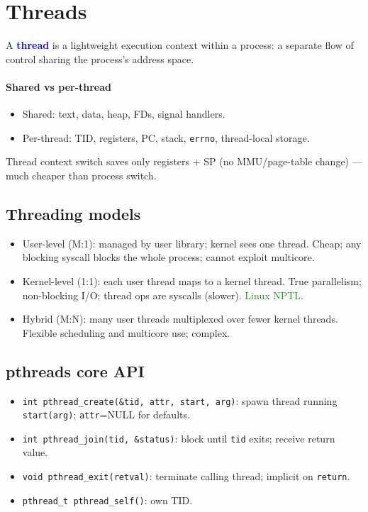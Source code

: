 \section{Threads}
A \textcolor{Blue}{\textbf{thread}} is a lightweight execution context within a process: a separate flow of control sharing the process's address space.

\paragraph{Shared vs per-thread}
\begin{itemize}
  \item \textcolor{Bittersweet}{Shared}: text, data, heap, FDs, signal handlers.
  \item \textcolor{Bittersweet}{Per-thread}: TID, registers, PC, stack, \texttt{errno}, thread-local storage.
\end{itemize}
Thread context switch saves only registers + SP (no MMU/page-table change) — much cheaper than process switch.

\subsection{Threading models}
\begin{itemize}
  \item \textcolor{Bittersweet}{User-level (M:1)}: managed by user library; kernel sees one thread. Cheap; \textcolor{Bittersweet}{any} blocking syscall blocks the whole process; cannot exploit multicore.
  \item \textcolor{Bittersweet}{Kernel-level (1:1)}: each user thread maps to a kernel thread. True parallelism; non-blocking I/O; thread ops are syscalls (slower). \textcolor{ForestGreen}{Linux NPTL}.
  \item \textcolor{Bittersweet}{Hybrid (M:N)}: many user threads multiplexed over fewer kernel threads. Flexible scheduling and multicore use; complex.
\end{itemize}

\subsection{pthreads core API}
\begin{itemize}
  \item \texttt{int \textcolor{Bittersweet}{pthread\_create}(\&tid, attr, start, arg)}: spawn thread running \texttt{start(arg)}; \texttt{attr}=NULL for defaults.
  \item \texttt{int \textcolor{Bittersweet}{pthread\_join}(tid, \&status)}: block until \texttt{tid} exits; receive return value.
  \item \texttt{void \textcolor{Bittersweet}{pthread\_exit}(retval)}: terminate calling thread; implicit on \texttt{return}.
  \item \texttt{pthread\_t \textcolor{Bittersweet}{pthread\_self}()}: own TID.
\end{itemize}


